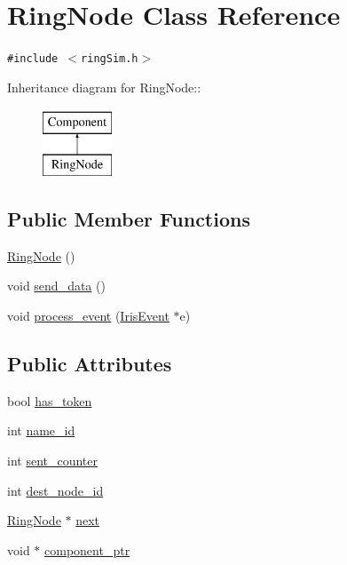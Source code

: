 \hypertarget{classRingNode}{
\section{RingNode Class Reference}
\label{classRingNode}
}
{\tt \#include $<$ringSim.h$>$}

Inheritance diagram for RingNode::\begin{figure}[H]
\begin{center}
\leavevmode
\includegraphics[height=2cm]{classRingNode}
\end{center}
\end{figure}
\subsection*{Public Member Functions}
\begin{CompactItemize}
\item 
\hyperlink{classRingNode_ec76ce82eb33fd07810fc15f145e9043}{RingNode} ()
\item 
void \hyperlink{classRingNode_fa70c07a8733562f35198666826ab49a}{send\_\-data} ()
\item 
void \hyperlink{classRingNode_bf1a89c9a338856bb040b2aef89df6d9}{process\_\-event} (\hyperlink{classIrisEvent}{IrisEvent} $\ast$e)
\end{CompactItemize}
\subsection*{Public Attributes}
\begin{CompactItemize}
\item 
bool \hyperlink{classRingNode_95e416d08952e356d6b2aa127b0b755b}{has\_\-token}
\item 
int \hyperlink{classRingNode_684faa99d894fa7f2ffd3a877b98f75d}{name\_\-id}
\item 
int \hyperlink{classRingNode_b9fb6f8509e1a43f315be89abda03a0c}{sent\_\-counter}
\item 
int \hyperlink{classRingNode_bc0c49f826af231d60c340df13223e1f}{dest\_\-node\_\-id}
\item 
\hyperlink{classRingNode}{RingNode} $\ast$ \hyperlink{classRingNode_96bfff0fd9bfdc0ffc30336b2deeb268}{next}
\item 
void $\ast$ \hyperlink{classRingNode_d7e7913b6ffa8a091a0fc7c0fc6a38b2}{component\_\-ptr}
\end{CompactItemize}



